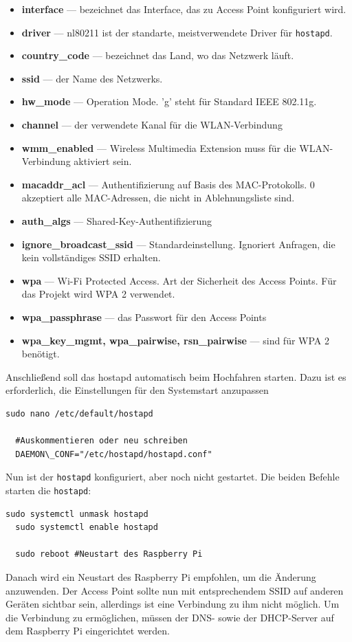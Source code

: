 \documentclass[12pt, letterpaper]{article}
\begin{document}
\begin{itemize}
  \item[\textbullet] \textbf{interface} --- bezeichnet das Interface, das zu Access Point konfiguriert wird.
  \item[\textbullet] \textbf{driver} --- nl80211 ist der standarte, meistverwendete Driver für \texttt{hostapd}.
  \item[\textbullet] \textbf{country\_code} --- bezeichnet das Land, wo das Netzwerk läuft.
  \item[\textbullet] \textbf{ssid} --- der Name des Netzwerks.
  \item[\textbullet] \textbf{hw\_mode}  --- Operation Mode. 'g' steht für Standard IEEE 802.11g.
  \item[\textbullet] \textbf{channel} --- der verwendete Kanal für die WLAN-Verbindung
  \item[\textbullet] \textbf{wmm\_enabled} --- Wireless Multimedia Extension muss für die WLAN-Verbindung aktiviert sein.
  \item[\textbullet] \textbf{macaddr\_acl} --- Authentifizierung auf Basis des MAC-Protokolls. 0 akzeptiert alle MAC-Adressen, die nicht in Ablehnungsliste sind.
  \item[\textbullet] \textbf{auth\_algs} --- Shared-Key-Authentifizierung
  \item[\textbullet] \textbf{ignore\_broadcast\_ssid} --- Standardeinstellung. Ignoriert Anfragen, die kein vollständiges SSID erhalten.
  \item[\textbullet] \textbf{wpa} --- Wi-Fi Protected Access. Art der Sicherheit des Access Points. Für das Projekt wird WPA 2 verwendet.
  \item[\textbullet] \textbf{wpa\_passphrase} --- das Passwort für den Access Points
  \item[\textbullet] \textbf{wpa\_key\_mgmt, wpa\_pairwise, rsn\_pairwise} --- sind für WPA 2 benötigt.
\end{itemize}
\par Anschließend soll das hostapd automatisch beim Hochfahren starten. Dazu ist es erforderlich, die Einstellungen für den Systemstart anzupassen
\begin{Verbatim}[frame=single]
  sudo nano /etc/default/hostapd

  #Auskommentieren oder neu schreiben
  DAEMON\_CONF="/etc/hostapd/hostapd.conf"
\end{Verbatim}
\par Nun ist der \texttt{hostapd} konfiguriert, aber noch nicht gestartet. Die beiden Befehle starten die \texttt{hostapd}:
\begin{Verbatim}[frame=single]
  sudo systemctl unmask hostapd
  sudo systemctl enable hostapd

  sudo reboot #Neustart des Raspberry Pi
\end{Verbatim}
\par Danach wird ein Neustart des Raspberry Pi empfohlen, um die Änderung anzuwenden. Der Access Point sollte nun mit entsprechendem SSID auf anderen Geräten sichtbar sein, allerdings ist eine Verbindung zu ihm nicht möglich. Um die Verbindung zu ermöglichen, müssen der DNS- sowie der DHCP-Server auf dem Raspberry Pi eingerichtet werden.
\end{document}
